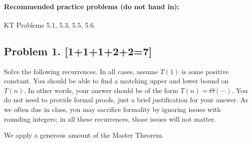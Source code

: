 \documentclass[10pt]{article}
\begin{document}
\paragraph{Recommended practice problems (do not hand in):} KT Problems 5.1, 5.3, 5.5, 5.6. 

\newpage

\subsection*{Problem 1. [1+1+1+2+2=7]}

  Solve the following recurrences. In all cases, assume $T(1)$ is some positive constant. You should be able to find a matching upper and lower bound on $T(n)$. In other words, your answer should be of the form $T(n) = \Theta(\cdots)$. You do not need to provide formal proofs, just a brief justification for your answer. As we often due in class, you may sacrifice formality by ignoring issues with rounding integers; in all these recurrences, those issues will not matter.

We apply a generous amount of the Master Theorem. 
\end{document}
